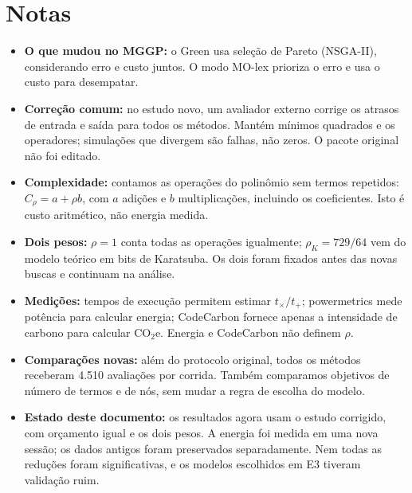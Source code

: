 \section*{Notas}
\begin{itemize}
\item \textbf{O que mudou no MGGP:} o Green usa seleção de Pareto (NSGA-II), considerando erro e custo juntos. O modo MO-lex prioriza o erro e usa o custo para desempatar.
\item \textbf{Correção comum:} no estudo novo, um avaliador externo corrige os atrasos de entrada e saída para todos os métodos. Mantém mínimos quadrados e os operadores; simulações que divergem são falhas, não zeros. O pacote original não foi editado.
\item \textbf{Complexidade:} contamos as operações do polinômio sem termos repetidos: $C_\rho=a+\rho b$, com $a$ adições e $b$ multiplicações, incluindo os coeficientes. Isto é custo aritmético, não energia medida.
\item \textbf{Dois pesos:} $\rho=1$ conta todas as operações igualmente; $\rho_K=729/64$ vem do modelo teórico em bits de Karatsuba. Os dois foram fixados antes das novas buscas e continuam na análise.
\item \textbf{Medições:} tempos de execução permitem estimar $t_\times/t_+$; powermetrics mede potência para calcular energia; CodeCarbon fornece apenas a intensidade de carbono para calcular CO$_2$e. Energia e CodeCarbon não definem $\rho$.
\item \textbf{Comparações novas:} além do protocolo original, todos os métodos receberam 4.510 avaliações por corrida. Também comparamos objetivos de número de termos e de nós, sem mudar a regra de escolha do modelo.
\item \textbf{Estado deste documento:} os resultados agora usam o estudo corrigido, com orçamento igual e os dois pesos. A energia foi medida em uma nova sessão; os dados antigos foram preservados separadamente. Nem todas as reduções foram significativas, e os modelos escolhidos em E3 tiveram validação ruim.
\end{itemize}
